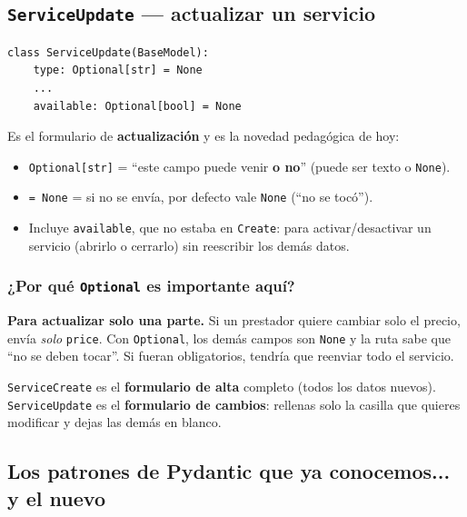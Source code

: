 \documentclass[11pt,a4paper]{article}
\begin{document}
\subsection{\texttt{ServiceUpdate} --- actualizar un servicio}

\begin{lstlisting}
class ServiceUpdate(BaseModel):
    type: Optional[str] = None
    ...
    available: Optional[bool] = None
\end{lstlisting}

Es el formulario de \textbf{actualización} y es la novedad pedagógica de hoy:

\begin{itemize}
    \item \texttt{Optional[str]} = ``este campo puede venir \textbf{o no}'' (puede ser texto o \texttt{None}).
    \item \texttt{= None} = si no se envía, por defecto vale \texttt{None} (``no se tocó'').
    \item Incluye \texttt{available}, que no estaba en \texttt{Create}: para activar/desactivar
    un servicio (abrirlo o cerrarlo) sin reescribir los demás datos.
\end{itemize}

\subsubsection{¿Por qué \texttt{Optional} es importante aquí?}

\textbf{Para actualizar solo una parte.} Si un prestador quiere cambiar solo el precio, envía
\emph{solo} \texttt{price}. Con \texttt{Optional}, los demás campos son \texttt{None} y la ruta
sabe que ``no se deben tocar''. Si fueran obligatorios, tendría que reenviar todo el servicio.

\begin{analogia}
\texttt{ServiceCreate} es el \textbf{formulario de alta} completo (todos los datos nuevos).
\texttt{ServiceUpdate} es el \textbf{formulario de cambios}: rellenas solo la casilla que
quieres modificar y dejas las demás en blanco.
\end{analogia}

\subsection{Los patrones de Pydantic que ya conocemos... y el nuevo}
\end{document}
